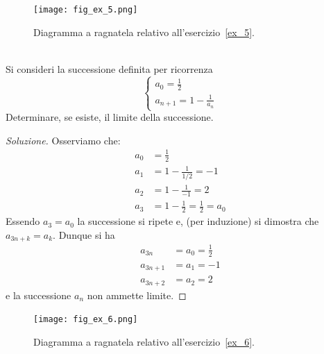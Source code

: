 \newsavebox{\qrexcinque}
\begin{figure}
 \begin{center}
    \texttt{[image: fig\_ex\_5.png]}
  \end{center}
  \caption{Diagramma a ragnatela relativo
    all'esercizio~\ref{ex_5}.\\\\
    \usebox{\qrexcinque}}
  \label{fig_ex_5}
\end{figure}

\begin{exercise}\label{ex_5}
  Si consideri la successione definita per ricorrenza
  \[
  \begin{cases}
    a_0 = \frac 1 2\\
    a_{n+1} = 1 - \frac{1}{a_n}
  \end{cases}
  \]
  Determinare, se esiste, il limite della successione.
\end{exercise}

\begin{proof}[Soluzione]
  Osserviamo che:
  \begin{align*}
    a_0 &= \frac 1 2 \\
    a_1 &= 1 - \frac{1}{1/2} = -1\\
    a_2 &= 1 - \frac{1}{-1} = 2\\
    a_3 &= 1 - \frac{1}{2} = \frac 1 2 = a_0
  \end{align*}
  Essendo $a_3 = a_0$ la successione si ripete e, (per induzione) si
  dimostra che $a_{3n+k} = a_k$. Dunque si ha
  \begin{align*}
    a_{3n} &= a_0 = \frac 1 2\\
    a_{3n+1} &= a_1 = -1\\
    a_{3n+2} &= a_2 = 2
  \end{align*}
  e la successione $a_n$ non ammette limite.
\end{proof}

\newsavebox{\qrexsei}
\begin{figure}
  \begin{center}
    \texttt{[image: fig\_ex\_6.png]}
  \end{center}
  \caption{Diagramma a ragnatela relativo
    all'esercizio~\ref{ex_6}.\\\\
    \usebox{\qrexsei}}
  \label{fig_ex_6}
\end{figure}

